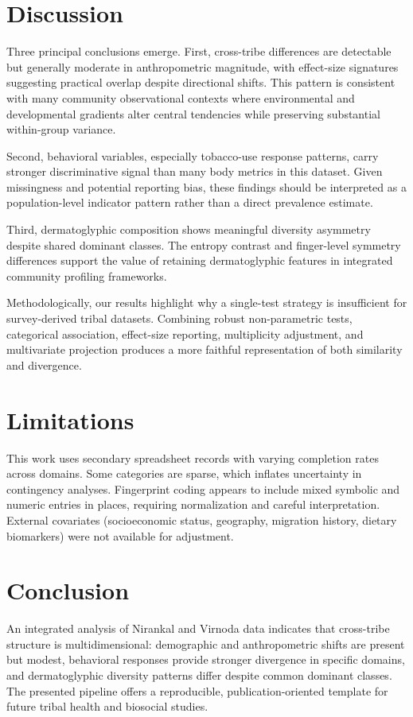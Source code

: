 \documentclass[pdflatex,sn-mathphys-num]{sn-jnl}
\begin{document}
\section{Discussion}
Three principal conclusions emerge. First, cross-tribe differences are detectable but generally moderate in anthropometric magnitude, with effect-size signatures suggesting practical overlap despite directional shifts. This pattern is consistent with many community observational contexts where environmental and developmental gradients alter central tendencies while preserving substantial within-group variance.

Second, behavioral variables, especially tobacco-use response patterns, carry stronger discriminative signal than many body metrics in this dataset. Given missingness and potential reporting bias, these findings should be interpreted as a population-level indicator pattern rather than a direct prevalence estimate.

Third, dermatoglyphic composition shows meaningful diversity asymmetry despite shared dominant classes. The entropy contrast and finger-level symmetry differences support the value of retaining dermatoglyphic features in integrated community profiling frameworks.

Methodologically, our results highlight why a single-test strategy is insufficient for survey-derived tribal datasets. Combining robust non-parametric tests, categorical association, effect-size reporting, multiplicity adjustment, and multivariate projection produces a more faithful representation of both similarity and divergence.

\section{Limitations}
This work uses secondary spreadsheet records with varying completion rates across domains. Some categories are sparse, which inflates uncertainty in contingency analyses. Fingerprint coding appears to include mixed symbolic and numeric entries in places, requiring normalization and careful interpretation. External covariates (socioeconomic status, geography, migration history, dietary biomarkers) were not available for adjustment.

\section{Conclusion}
An integrated analysis of Nirankal and Virnoda data indicates that cross-tribe structure is multidimensional: demographic and anthropometric shifts are present but modest, behavioral responses provide stronger divergence in specific domains, and dermatoglyphic diversity patterns differ despite common dominant classes. The presented pipeline offers a reproducible, publication-oriented template for future tribal health and biosocial studies.
\end{document}
